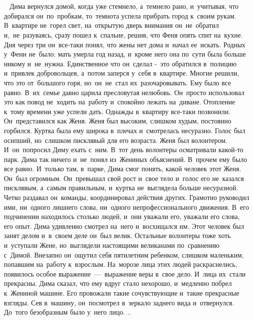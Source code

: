 ~

~

~
Дима вернулся домой, когда уже стемнело, а~темнело рано, и~учитывая, что добирался он~по~пробкам, то~темнота успела прибрать город к~своим рукам.
В~квартире не~горел свет, на~открытую дверь внимания он~не~обратил и,~не~разуваясь, сразу пошел к~спальне, решив, что Феня опять спит на~кухне.
Дня через три он~все-таки понял, что жены нет дома и~начал ее~искать.
Родных у~Фени не~было: мать умерла год назад, и~кроме него она по~сути была больше никому и~не~нужна.
Единственное что он~сделал -~это обратился в~полицию и~привлек добровольцев, а~потом заперся у~себя в~квартире.
Многие решили, что это от~большого горя, но~он~не~стал их~разочаровывать.
Ему было все равно.
В~их~семье давно царила пресловутая нелюбовь.
Он~просто использовал это как повод не~ходить на~работу и~спокойно лежать на~диване.
Отопление к~тому времени уже успели дать.
Однажды в~квартиру все-таки позвонили.
Он~представился как Женя.
Женя был высоким, слишком худым, постоянно горбился.
Куртка была ему широка в~плечах и~смотрелась несуразно.
Голос был осипший, но~слишком писклявый для его возраста.
Женя был волонтером.
И~он~попросил Диму ехать с~ним.
В~тот день волонтеры осматривали какой-то парк.
Дима так ничего и~не~понял из~Жениных объяснений.
В~прочем ему было все равно.
И~только там, в~парке, Дима смог понять, какой человек этот Женя.
Он~был огромным.
Он~превышал свой рост и~свое тело и~голос его не~казался писклявым, а~самым правильным, и~куртка не~выглядела больше несуразной.
Четко раздавал он~команды, координировал действия других.
Грамотно руководил ими, ни~одного лишнего слова, ни~одного непрофессионального движения.
В~его подчинении находилось столько людей, и~они уважали его, уважали его слова, его опыт.
Дима удивленно смотрел на~него и~восхищался им.
Этот человек был занят делом и~в~своем деле он~был велик.
Остальные волонтеры тоже хоть и~уступали Жене, но~выглядели настоящими великанами по~сравнению с~Димой.
Внезапно он~ощутил себя пятилетним ребенком, слишком маленьким, попавшим на~работу к~взрослым.
На~морозе лица этих людей раскраснелись, появилось особое выражение~---~выражение веры в~свое дело.
И~лица их~стали прекрасны.
Дима сказал, что ему вдруг стало нехорошо, и~медленно побрел к~Жениной машине.
Его провожали такие сочувствующие и~такие прекрасные взгляды.
Сев в~машину, он~посмотрел в~зеркало заднего вида и~отвернулся.
До~того безобразным было у~него лицо.
..
 
